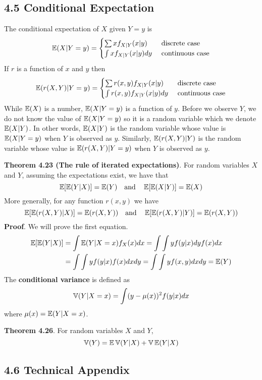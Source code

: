 \subsection*{4.5 Conditional
Expectation}\label{conditional-expectation}
The conditional expectation of \(X\) given \(Y = y\) is
\[
\operatorname{\mathbb{E}}(X | Y = y) = \begin{cases}
\sum x f_{X | Y}(x | y) &\text{ discrete case} \\
\int x f_{X | Y}(x | y) dy &\text{ continuous case}
\end{cases}
\]
If \(r\) is a function of \(x\) and \(y\) then
\[
\operatorname{\mathbb{E}}(r(X, Y) | Y = y) = \begin{cases}
\sum r(x, y) f_{X | Y}(x | y) &\text{ discrete case} \\
\int r(x, y) f_{X | Y}(x | y) dy &\text{ continuous case}
\end{cases}
\]
While \(\operatorname{\mathbb{E}}(X)\) is a number, \(\operatorname{\mathbb{E}}(X | Y = y)\) is a
function of \(y\). Before we observe \(Y\), we do not know the value of
\(\operatorname{\mathbb{E}}(X | Y = y)\) so it is a random variable which we denote
\(\operatorname{\mathbb{E}}(X | Y)\). In other words, \(\operatorname{\mathbb{E}}(X | Y)\) is the
random variable whose value is \(\operatorname{\mathbb{E}}(X | Y = y)\) when \(Y\) is
observed as \(y\). Similarly, \(\operatorname{\mathbb{E}}(r(X, Y) | Y)\) is the random
variable whose value is \(\operatorname{\mathbb{E}}(r(X, Y) | Y = y)\) when \(Y\) is
observed as \(y\).

\textbf{Theorem 4.23 (The rule of iterated expectations)}. For random
variables \(X\) and \(Y\), assuming the expectations exist, we have that
\[
\operatorname{\mathbb{E}}[\operatorname{\mathbb{E}}(Y | X)] = \operatorname{\mathbb{E}}(Y)
\quad \text{and} \quad
\operatorname{\mathbb{E}}[\operatorname{\mathbb{E}}(X | Y)] = \operatorname{\mathbb{E}}(X)
\]
More generally, for any function \(r(x, y)\) we have
\[
\operatorname{\mathbb{E}}[\operatorname{\mathbb{E}}(r(X, Y) | X)] = \operatorname{\mathbb{E}}(r(X, Y))
\quad \text{and} \quad
\operatorname{\mathbb{E}}[\operatorname{\mathbb{E}}(r(X, Y) | Y)] = \operatorname{\mathbb{E}}(r(X, Y))
\]
\textbf{Proof}. We will prove the first equation.
\begin{align*}
\operatorname{\mathbb{E}}[\operatorname{\mathbb{E}}(Y | X)] &= \int \operatorname{\mathbb{E}}(Y | X = x) f_X(x) dx = \int \int y f(y | x) dy f(x) dx \\
&= \int \int y f(y|x) f(x) dx dy = \int \int y f(x, y) dx dy = \operatorname{\mathbb{E}}(Y)
\end{align*}
The \textbf{conditional variance} is defined as
\[
\operatorname{\mathbb{V}}(Y | X = x) = \int (y - \mu(x))^{2} f(y | x) dx
\]
where \(\mu(x) = \operatorname{\mathbb{E}}(Y | X = x)\).

\textbf{Theorem 4.26}. For random variables \(X\) and \(Y\),
\[
\operatorname{\mathbb{V}}(Y) = \operatorname{\mathbb{E}}\operatorname{\mathbb{V}}(Y | X) + \operatorname{\mathbb{V}} \operatorname{\mathbb{E}} (Y | X)
\]

\subsection*{4.6 Technical Appendix}
